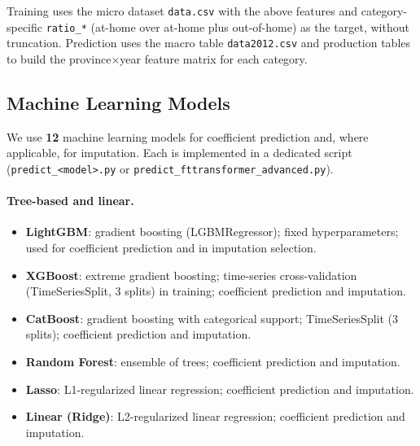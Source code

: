 Training uses the micro dataset \texttt{data.csv} with the above features and category-specific \texttt{ratio\_*} (at-home over at-home plus out-of-home) as the target, without truncation. Prediction uses the macro table \texttt{data2012.csv} and production tables to build the province$\times$year feature matrix for each category.

\subsection{Machine Learning Models}
\label{sec:models}

We use \textbf{12} machine learning models for coefficient prediction and, where applicable, for imputation. Each is implemented in a dedicated script (\texttt{predict\_<model>.py} or \texttt{predict\_fttransformer\_advanced.py}).

\paragraph{Tree-based and linear.}
\begin{itemize}
  \item \textbf{LightGBM}: gradient boosting (LGBMRegressor); fixed hyperparameters; used for coefficient prediction and in imputation selection.
  \item \textbf{XGBoost}: extreme gradient boosting; time-series cross-validation (TimeSeriesSplit, 3 splits) in training; coefficient prediction and imputation.
  \item \textbf{CatBoost}: gradient boosting with categorical support; TimeSeriesSplit (3 splits); coefficient prediction and imputation.
  \item \textbf{Random Forest}: ensemble of trees; coefficient prediction and imputation.
  \item \textbf{Lasso}: L1-regularized linear regression; coefficient prediction and imputation.
  \item \textbf{Linear (Ridge)}: L2-regularized linear regression; coefficient prediction and imputation.
\end{itemize}

